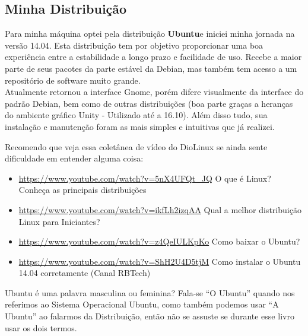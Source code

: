 \subsection{Minha Distribuição}
Para minha máquina optei pela distribuição \textbf{Ubuntu}e iniciei minha jornada na versão 14.04. Esta distribuição tem por objetivo proporcionar uma boa experiência entre a estabilidade a longo prazo e facilidade de uso. Recebe a maior parte de seus pacotes da parte estável da Debian, mas também tem acesso a um repositório de software muito grande. \\[3mm]
Atualmente retornou a interface Gnome, porém difere visualmente da interface do padrão Debian, bem como de outras distribuições (boa parte graças a heranças do ambiente gráfico Unity - Utilizado até a 16.10). Além disso tudo, sua instalação e manutenção foram as mais simples e intuitivas que já realizei.
\\[3mm]
\begin{dica} Recomendo que veja essa coletânea de vídeo do DioLinux se ainda sente dificuldade em entender alguma coisa:
 \begin{itemize}[noitemsep]
   \item \url{https://www.youtube.com/watch?v=5nX4UFQt_JQ} O que é Linux? Conheça as principais distribuições
   \item \url{https://www.youtube.com/watch?v=ikfLh2izqAA} Qual a melhor distribuição Linux para Iniciantes?
   \item \url{https://www.youtube.com/watch?v=z4QeIULKpKo} Como baixar o Ubuntu?
   \item \url{https://www.youtube.com/watch?v=ShH2U4D5tjM} Como instalar o Ubuntu 14.04 corretamente (Canal RBTech)
 \end{itemize}
\end{dica}

Ubuntu é uma palavra masculina ou feminina? Fala-se ``O Ubuntu'' quando nos referimos ao Sistema Operacional Ubuntu, como também podemos usar ``A Ubuntu'' ao falarmos da Distribuição, então não se assuste se durante esse livro usar os dois termos.

\clearpage